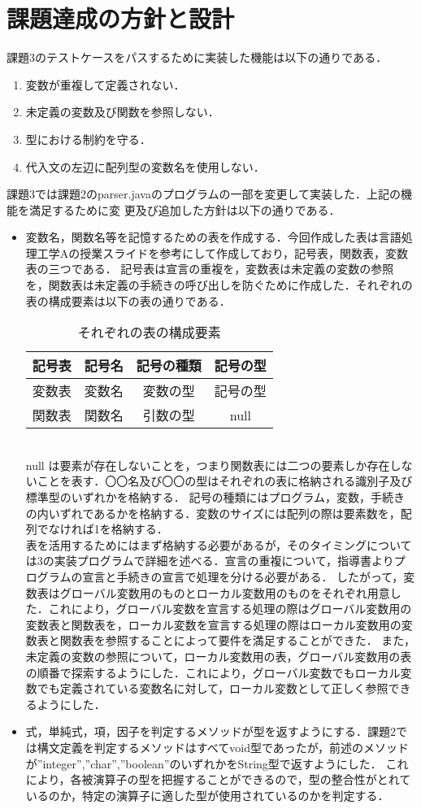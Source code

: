 \documentclass[dvipdfmx]{jarticle}
\begin{document}
\section{課題達成の方針と設計}
課題3のテストケースをパスするために実装した機能は以下の通りである．
\begin{enumerate}
  \item 変数が重複して定義されない．
  \item 未定義の変数及び関数を参照しない．
  \item 型における制約を守る．
  \item 代入文の左辺に配列型の変数名を使用しない．
\end{enumerate}
課題3では課題2のparser.javaのプログラムの一部を変更して実装した．上記の機能を満足するために変
更及び追加した方針は以下の通りである．
\begin{itemize}
  \item 変数名，関数名等を記憶するための表を作成する．今回作成した表は言語処理工学Aの授業スライドを参考にして作成しており，記号表，関数表，変数表の三つである．
  記号表は宣言の重複を，変数表は未定義の変数の参照を，関数表は未定義の手続きの呼び出しを防ぐために作成した．それぞれの表の構成要素は以下の表の通りである．
  \begin{table}[h]
    \centering
    \begin{tabular}{|c||c|c|c|}
      \hline
      記号表 & 記号名 & 記号の種類 & 記号の型\\\hline
      変数表 & 変数名 & 変数の型 & 記号の型\\\hline
      関数表 & 関数名 & 引数の型 & null\\\hline
    \end{tabular}
    \caption{それぞれの表の構成要素}
  \end{table}
  \\null は要素が存在しないことを，つまり関数表には二つの要素しか存在しないことを表す．〇〇名及び〇〇の型はそれぞれの表に格納される識別子及び標準型のいずれかを格納する．
  記号の種類にはプログラム，変数，手続きの内いずれであるかを格納する．変数のサイズには配列の際は要素数を，配列でなければ1を格納する．
  \\
  表を活用するためにはまず格納する必要があるが，そのタイミングについては3の実装プログラムで詳細を述べる．宣言の重複について，指導書よりプログラムの宣言と手続きの宣言で処理を分ける必要がある．
  したがって，変数表はグローバル変数用のものとローカル変数用のものをそれぞれ用意した．これにより，グローバル変数を宣言する処理の際はグローバル変数用の変数表と関数表を，ローカル変数を宣言する処理の際はローカル変数用の変数表と関数表を参照することによって要件を満足することができた．
  また，未定義の変数の参照について，ローカル変数用の表，グローバル変数用の表の順番で探索するようにした．これにより，グローバル変数でもローカル変数でも定義されている変数名に対して，ローカル変数として正しく参照できるようにした．
  \item 式，単純式，項，因子を判定するメソッドが型を返すようにする．課題2では構文定義を判定するメソッドはすべてvoid型であったが，前述のメソッドが”integer”,”char”,”boolean”のいずれかをString型で返すようにした．
  これにより，各被演算子の型を把握することができるので，型の整合性がとれているのか，特定の演算子に適した型が使用されているのかを判定する．
\end{itemize}
\end{document}
